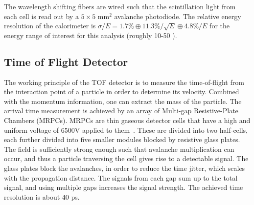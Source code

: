 The wavelength shifting fibers are wired such that the scintillation light from each cell is read out by a $5\times5$ mm$^2$ avalanche photodiode. The relative energy resolution of the calorimeter is $\sigma/E = 1.7\% \oplus 11.3\%/\sqrt{E} \oplus 4.8\%/E$ for the energy range of interest for this analysis (roughly 10-50 \GeVc).


\subsection{Time of Flight Detector}
\label{sec:TOF}
The working principle of the TOF detector is to measure the time-of-flight from the interaction point of a particle in order to determine its velocity. Combined with the momentum information, one can extract the mass of the particle. The arrival time measurement is achieved by an array of Multi-gap Resistive-Plate Chambers (MRPCs). MRPCs are thin gaseous detector cells that have a high and uniform voltage of 6500V applied to them~\cite{Carnesecchi2019a,Aamodt:2008zz}. These are divided into two half-cells, each further divided into five smaller modules blocked by resistive glass plates. The field is sufficiently strong enough such that avalanche multiplication can occur, and thus a particle traversing the cell gives rise to a detectable signal. The glass plates block the avalanches, in order to reduce the time jitter, which scales with the propagation distance. The signals from each gap sum up to the total signal, and using multiple gaps increases the signal strength. The achieved time resolution is about 40 ps.

